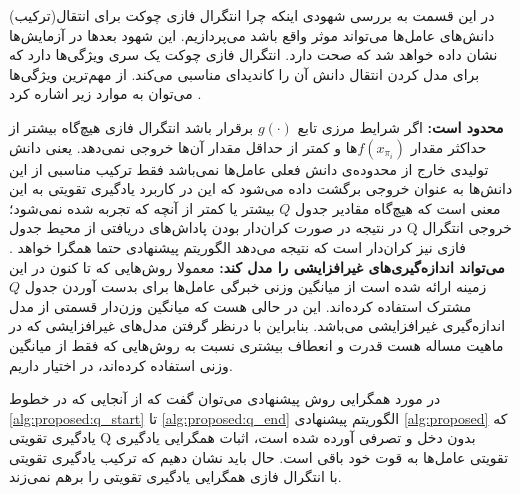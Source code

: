 \label{sec:why_fci_works}
در این قسمت به بررسی شهودی اینکه چرا انتگرال فازی چوکت برای انتقال(ترکیب) دانش‌های عامل‌ها می‌تواند موثر واقع باشد می‌پردازیم. این شهود بعدها در آزمایش‌ها نشان داده خواهد شد که صحت دارد. انتگرال فازی چوکت یک سری ویژگی‌ها دارد که برای مدل کردن انتقال دانش آن را کاندیدای مناسبی می‌کند. از مهم‌ترین ویژگی‌ها می‌توان به موارد زیر اشاره کرد .
\begin{enumerate}
 \textbf{محدود است:} اگر شرایط مرزی تابع $g(\cdot)$ برقرار باشد انتگرال‌ فازی هیچ‌گاه بیشتر از حداکثر مقدار $f(x_{\pi_i})$ها و کمتر از حداقل مقدار آن‌ها خروجی نمی‌دهد. یعنی دانش تولیدی خارج از محدوده‌ی دانش فعلی عامل‌ها نمی‌باشد فقط ترکیب مناسبی از این دانش‌ها به عنوان خروجی برگشت داده می‌شود که این در کاربرد یادگیری تقویتی به این معنی است که هیچ‌گاه مقادیر جدول $Q$ بیشتر یا کمتر از آنچه که تجربه شده نمی‌شود؛ در نتیجه در صورت کران‌دار بودن پاداش‌های دریافتی از محیط جدول Q خروجی انتگرال فازی نیز کران‌دار است که نتیجه می‌دهد الگوریتم پیشنهادی حتما همگرا خواهد .
 \textbf{می‌تواند اندازه‌گیری‌های غیرافزایشی را مدل کند:} معمولا روش‌هایی که تا ‌کنون در این زمینه ارائه شده است از میانگین وزنی خبرگی عامل‌ها برای بدست آوردن جدول $Q$ مشترک استفاده کرده‌اند. این در حالی هست که میانگین وزن‌دار قسمتی از مدل اندازه‌گیری‌ غیرافزایشی می‌باشد. بنابراین با درنظر گرفتن مدل‌های غیرافزایشی که در ماهیت مساله هست قدرت و انعطاف بیشتری نسبت به روش‌هایی که فقط از میانگین وزنی استفاده کرده‌اند، در اختیار داریم.
\end{enumerate}

در مورد همگرایی روش پیشنهادی می‌توان گفت که از آنجایی که در خطوط
\ref{alg:proposed:q_start} تا \ref{alg:proposed:q_end}
الگوریتم پیشنهادی
\ref{alg:proposed}
که یادگیری تقویتی Q بدون دخل و تصرفی آورده شده است، اثبات همگرایی یادگیری تقویتی عامل‌ها به قوت خود باقی است. حال باید نشان دهیم که ترکیب یادگیری تقویتی با انتگرال فازی همگرایی یادگیری تقویتی را برهم نمی‌زند.

